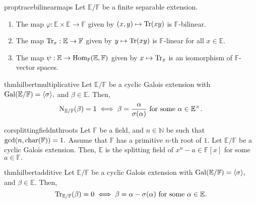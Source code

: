\begin{restatable}[]{prop}{tracebilinearmaps}
\label{prop:tracebilinearmaps}
	Let $\mathbb{E}/\mathbb{F}$ be a finite separable extension. 
	\begin{enumerate}
		\item The map $\varphi : \mathbb{E} \times \mathbb{E} \to \mathbb{F}$ given by $(x, y) \mapsto \operatorname{Tr}(xy)$ is $\mathbb{F}$-bilinear.
		\item The map $\operatorname{Tr}_x : \mathbb{E} \to \mathbb{F}$ given by $y \mapsto \operatorname{Tr}(xy)$ is $\mathbb{F}$-linear for all $x \in \mathbb{E}.$
		\item The map $\psi : \mathbb{E} \to \operatorname{Hom}_{\mathbb{F}}(\mathbb{E}, \mathbb{F})$ given by $x \mapsto \operatorname{Tr}_x$ is an isomorphism of $\mathbb{F}$-vector spaces.
	\end{enumerate}\hfill\hyperref[prop:tracebilinearmaps2]{\downsym}
\end{restatable}

\begin{restatable}{thm}{hilbertmultiplicative}
\label{thm:hilbertmultiplicative}
	Let $\mathbb{E}/\mathbb{F}$ be a cyclic Galois extension with $\operatorname{Gal}(\mathbb{E}/\mathbb{F}) = \langle \sigma\rangle,$ and $\beta \in \mathbb{E}.$ Then,
	\begin{equation*} 
		\operatorname{N}_{\mathbb{E}/\mathbb{F}}(\beta) = 1 \iff \beta = \frac{\alpha}{\sigma(\alpha)} \text{ for some } \alpha \in \mathbb{E}^\times.
	\end{equation*} 
	\hfill\hyperref[thm:hilbertmultiplicative2]{\downsym}
\end{restatable}

\begin{restatable}[]{cor}{splittingfieldnthroots}
\label{cor:splittingfieldnthroots}
	Let $\mathbb{F}$ be a field, and $n \in \mathbb{N}$ be such that $\gcd(n, \operatorname{char}(\mathbb{F})) = 1.$ Assume that $\mathbb{F}$ has a primitive $n$-th root of $1.$ Let $\mathbb{E}/\mathbb{F}$ be a cyclic Galois extension. Then, $\mathbb{E}$ is the splitting field of $x^n - a \in \mathbb{F}[x]$ for some $a \in \mathbb{F}.$ \hfill\hyperref[cor:splittingfieldnthroots2]{\downsym}
\end{restatable}

\begin{restatable}{thm}{hilbertadditive}
\label{thm:hilbertadditive}
	Let $\mathbb{E}/\mathbb{F}$ be a cyclic Galois extension with $\operatorname{Gal}(\mathbb{E}/\mathbb{F}) = \langle \sigma\rangle,$ and $\beta \in \mathbb{E}.$ Then,
	\begin{equation*} 
		\operatorname{Tr}_{\mathbb{E}/\mathbb{F}}(\beta) = 0 \iff \beta = \alpha - \sigma(\alpha) \text{ for some } \alpha \in \mathbb{E}.
	\end{equation*}  \hfill\hyperref[thm:hilbertadditive2]{\downsym}
\end{restatable}

